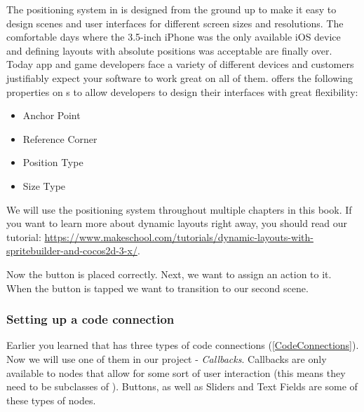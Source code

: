 \begin{details}
 \label{PositioningSystem}
The positioning system in \cocos{} is designed from the ground up to make it
easy to design scenes and user interfaces for different screen sizes and
resolutions. The comfortable days where the 3.5-inch iPhone was the only 
available iOS device and defining layouts with absolute positions was acceptable
are finally over. Today app and game developers face a variety of different
devices and customers justifiably expect your software to work great on all of
them. \cocos{} offers the following properties on \ccnode{}s to allow developers
to design their interfaces with great flexibility:

\begin{itemize}
  \item Anchor Point
  \item Reference Corner
  \item Position Type
  \item Size Type
\end{itemize}

We will use the positioning system throughout multiple chapters in this book.
If you want to learn more about dynamic layouts right away, you should read our tutorial:
\url{https://www.makeschool.com/tutorials/dynamic-layouts-with-spritebuilder-and-cocos2d-3-x/}.
\end{details}

Now the button is placed correctly. Next, we want to assign an action to it.
When the button is tapped we want to transition to our second scene.

\subsubsection{Setting up a code connection}

Earlier you learned that \SB{} has three types of code connections 
(\ref{CodeConnections}). Now we will use one of them in our project -
\textit{Callbacks}. Callbacks are only
available to nodes that allow for some sort of user interaction (this means they need to be subclasses of
). Buttons, as well as Sliders and Text Fields are some of
these types of nodes.

